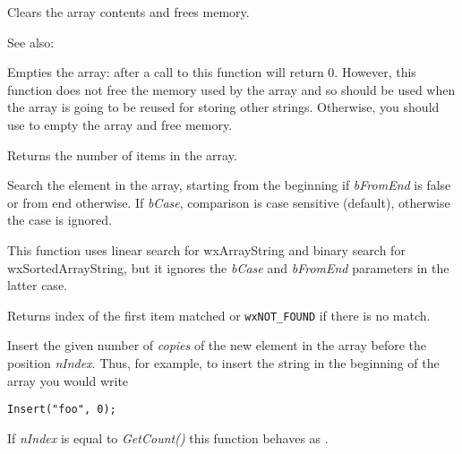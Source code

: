 Clears the array contents and frees memory.

See also: 

\label{wxarraystringempty}


Empties the array: after a call to this function 
 will return $0$. However, this
function does not free the memory used by the array and so should be used when
the array is going to be reused for storing other strings. Otherwise, you
should use  to empty the array and free
memory.

\label{wxarraystringgetcount}


Returns the number of items in the array.

\label{wxarraystringindex}


Search the element in the array, starting from the beginning if
{\it bFromEnd} is false or from end otherwise. If {\it bCase}, comparison is
case sensitive (default), otherwise the case is ignored.

This function uses linear search for wxArrayString and binary search for
wxSortedArrayString, but it ignores the {\it bCase} and {\it bFromEnd} 
parameters in the latter case.

Returns index of the first item matched or {\tt wxNOT\_FOUND} if there is no match.

\label{wxarraystringinsert}


Insert the given number of {\it copies} of the new element in the array before the position {\it nIndex}. Thus, for
example, to insert the string in the beginning of the array you would write

\begin{verbatim}
Insert("foo", 0);
\end{verbatim}

If {\it nIndex} is equal to {\it GetCount()} this function behaves as 
.


